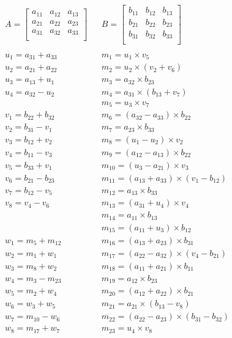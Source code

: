 \documentclass{article}
\begin{document}
\begin{align*}
    & A = \begin{bmatrix}
        a_{11} & a_{12} & a_{13} \\
        a_{21} & a_{22} & a_{23} \\
        a_{31} & a_{32} & a_{33} \\
    \end{bmatrix}
    &&
    B = \begin{bmatrix}
        b_{11} & b_{12} & b_{13} \\
        b_{21} & b_{22} & b_{23} \\
        b_{31} & b_{32} & b_{33} \\
    \end{bmatrix}
\\
\\
& u_{1} = a_{31} + a_{33} && m_{1} = u_{1} \times v_{5} \\
& u_{2} = a_{21} + a_{22} && m_{2} = u_{2} \times (v_{2} + v_{6}) \\
& u_{3} = a_{13} + u_{1} && m_{3} = a_{32} \times b_{23} \\
& u_{4} = a_{32} - u_{2} && m_{4} = a_{31} \times (b_{13} + v_{7}) \\
&  && m_{5} = u_{3} \times v_{7} \\
& v_{1} = b_{22} + b_{32} && m_{6} = (a_{32} - a_{33}) \times b_{22} \\
& v_{2} = b_{31} - v_{1} && m_{7} = a_{23} \times b_{33} \\
& v_{3} = b_{12} + v_{2} && m_{8} = (u_{1} - u_{2}) \times v_{2} \\
& v_{4} = b_{11} - v_{3} && m_{9} = (a_{12} - a_{13}) \times b_{22} \\
& v_{5} = b_{33} + v_{1} && m_{10} = (u_{3} - a_{21}) \times v_{3} \\
& v_{6} = b_{21} - b_{23} && m_{11} = (a_{13} + a_{33}) \times (v_{1} - b_{12}) \\
& v_{7} = b_{12} - v_{5} && m_{12} = a_{13} \times b_{33} \\
& v_{8} = v_{4} - v_{6} && m_{13} = (a_{31} + u_{4}) \times v_{4} \\
&  && m_{14} = a_{11} \times b_{13} \\
&  && m_{15} = (a_{11} + u_{3}) \times b_{12} \\
& w_{1} = m_{5} + m_{12} && m_{16} = (a_{13} + a_{23}) \times b_{31} \\
& w_{2} = m_{1} + w_{1} && m_{17} = (a_{22} - a_{32}) \times (v_{4} - b_{21}) \\
& w_{3} = m_{8} + w_{2} && m_{18} = (a_{11} + a_{21}) \times b_{11} \\
& w_{4} = m_{3} - m_{23} && m_{19} = a_{12} \times b_{23} \\
& w_{5} = m_{2} + w_{4} && m_{20} = (a_{12} + a_{22}) \times b_{21} \\
& w_{6} = w_{3} + w_{5} && m_{21} = a_{21} \times (b_{13} - v_{8}) \\
& w_{7} = m_{10} - w_{6} && m_{22} = (a_{22} - a_{23}) \times (b_{31} - b_{32}) \\
& w_{8} = m_{17} + w_{7} && m_{23} = u_{4} \times v_{8} \\
\end{align*}
\end{document}
